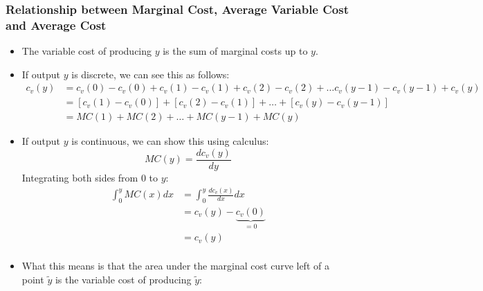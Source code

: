 \documentclass{article}
\begin{document}
\subsubsection*{Relationship between Marginal Cost, Average Variable Cost and Average Cost}
\begin{itemize}
  \item The variable cost of producing $y$ is the sum of marginal costs up to
    $y$.
  \item If output $y$ is discrete, we can see this as follows:
    \begin{align*}
      c_v\left( y \right)&=c_v\left( 0 \right) - c_v\left( 0 \right) +
      c_{v}\left( 1 \right)-c_v\left( 1 \right) +
      c_{v}\left( 2 \right)-c_v\left( 2 \right) + \dots
      c_{v}\left( y-1 \right)-c_v\left( y-1\right) + c_v\left( y \right) \\
    &= \left[c_v\left( 1 \right) - c_v\left( 0 \right)\right] +
    \left[c_v\left( 2 \right) - c_v\left( 1 \right)\right] + \dots +
    \left[c_v\left( y \right) - c_v\left( y-1 \right)\right] \\
    &= MC\left( 1 \right) + MC\left( 2 \right) + \dots + MC\left( y-1
    \right) + MC\left( y \right)
    \end{align*}
  \item If output $y$ is continuous, we can show this using calculus:
    \begin{equation*}
      MC\left( y \right)=\frac{dc_v\left( y \right)}{dy}
    \end{equation*}
    Integrating both sides from $0$ to $y$:
    \begin{align*}
      \int_0 ^y MC\left( x \right)dx&=\int_0^y\frac{dc_v\left( x \right)}{dx}dx\\
      &=c_v\left( y \right)-\underbrace{c_v\left( 0 \right)}_{=0}\\
      &=c_v\left( y \right)\\
    \end{align*}
  \item What this means is that the area under the marginal cost curve left of a point $\tilde{y}$ is the variable cost of producing $\tilde{y}$:
\end{itemize}
\begin{center}
\end{center}
\end{document}
